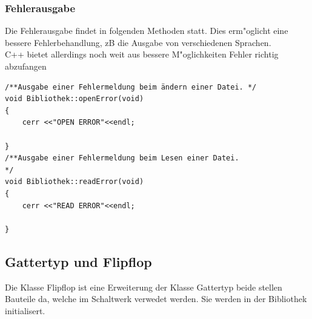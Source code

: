 \documentclass[a4paper,10pt,twoside]{report}
\newcounter{ausgabe}[chapter]
\begin{document}
\subsubsection{Fehlerausgabe}
Die Fehlerausgabe findet in folgenden Methoden statt. Dies erm"oglicht eine bessere Fehlerbehandlung, zB die Ausgabe von verschiedenen Sprachen.\\ C++ bietet allerdings noch weit aus bessere M"oglichkeiten Fehler richtig abzufangen
\begin{lstlisting}
/**Ausgabe einer Fehlermeldung beim ändern einer Datei. */
void Bibliothek::openError(void)
{
    cerr <<"OPEN ERROR"<<endl;

}
/**Ausgabe einer Fehlermeldung beim Lesen einer Datei.
*/
void Bibliothek::readError(void)
{
    cerr <<"READ ERROR"<<endl;

}
\end{lstlisting}

\subsection{Gattertyp und Flipflop}
Die Klasse Flipflop ist eine Erweiterung der Klasse Gattertyp beide stellen Bauteile da, welche im Schaltwerk verwedet werden. Sie werden in der Bibliothek initialisert.
\end{document}
